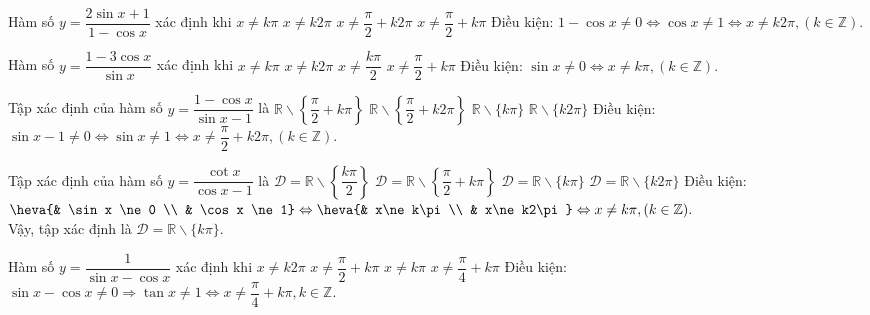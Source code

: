 \begin{ex}%
	Hàm số $ y=\dfrac{2 \sin x+1}{1-\cos x} $ xác định khi
	\choice
	{$ x \neq k \pi $}
	{\True$ x \neq k 2 \pi $}
	{$ x \neq \dfrac{\pi}{2}+k 2 \pi $}
	{$ x \neq \dfrac{\pi}{2}+k \pi $}
	\loigiai
	{
		Điều kiện: $ 1- \cos x \ne 0 \Leftrightarrow \cos x \ne 1 \Leftrightarrow x \ne k2\pi, (k\in \mathbb{Z})$.
	}
\end{ex}
\begin{ex}%
	Hàm số $ y=\dfrac{1-3 \cos x}{\sin x} $ xác định khi
	\choice
	{\True$ x \neq k \pi $}
	{$ x \neq k 2 \pi $}
	{$ x \neq \dfrac{k \pi}{2}  $}
	{$ x \neq \dfrac{\pi}{2}+k \pi $}
	\loigiai
	{
		Điều kiện: $ \sin x \ne 0 \Leftrightarrow x\ne k\pi, (k\in \mathbb{Z})$.
	}
\end{ex}
\begin{ex}%
	Tập xác định của hàm số $ y=\dfrac{1-\cos x}{\sin x-1} $ là 
	\choice
	{$ \mathbb{R} \backslash\left\{\dfrac{\pi}{2}+k \pi\right\}  $}
	{\True$ \mathbb{R} \backslash\left\{\dfrac{\pi}{2}+k 2 \pi\right\}  $}
	{$ \mathbb{R} \backslash\{k \pi\} $}
	{$ \mathbb{R} \backslash\{k 2 \pi\}  $}
	\loigiai
	{
		Điều kiện: $ \sin x -1 \ne 0 \Leftrightarrow \sin x \ne 1 \Leftrightarrow x\ne  \dfrac{\pi}{2}+k 2 \pi, (k\in \mathbb{Z}) $.
	}
\end{ex}
\begin{ex}%
	Tập xác định của hàm số $ y=\dfrac{\cot x}{\cos x-1} $ là
	\choice
	{$ \mathscr{D}=\mathbb{R} \backslash\left\{\dfrac{k \pi}{2}\right\} $}
	{$ \mathscr{D}=\mathbb{R} \backslash\left\{\dfrac{\pi}{2}+k \pi\right\}  $}
	{\True$ \mathscr{D}=\mathbb{R} \backslash\{k \pi\} $}
	{$\mathscr{D}=\mathbb{R} \backslash\{k 2 \pi\}  $}
	\loigiai
	{
		Điều kiện: $ \heva{& \sin x \ne 0 \\ & \cos x \ne 1} \Leftrightarrow \heva{& x\ne k\pi \\ & x\ne k2\pi}\Leftrightarrow x \ne k\pi ,(k \in \mathbb{Z}).$\\
		Vậy, tập xác định là $ \mathscr{D}=\mathbb{R} \backslash\{k \pi\} $.
	}
\end{ex}
\begin{ex}%
	Hàm số $ y=\dfrac{1}{\sin x-\cos x} $ xác định khi
	\choice
	{$ x \neq k 2 \pi  $}
	{$ x \neq \dfrac{\pi}{2}+k \pi  $}
	{$ x \neq k \pi  $}
	{\True$ x \neq \dfrac{\pi}{4}+k \pi  $}
	\loigiai
	{
		Điều kiện: $ \sin x - \cos x \ne 0 \Rightarrow \tan x \ne 1 \Leftrightarrow x \neq \dfrac{\pi}{4}+k \pi, k \in \mathbb{Z} $.
	}
\end{ex}
